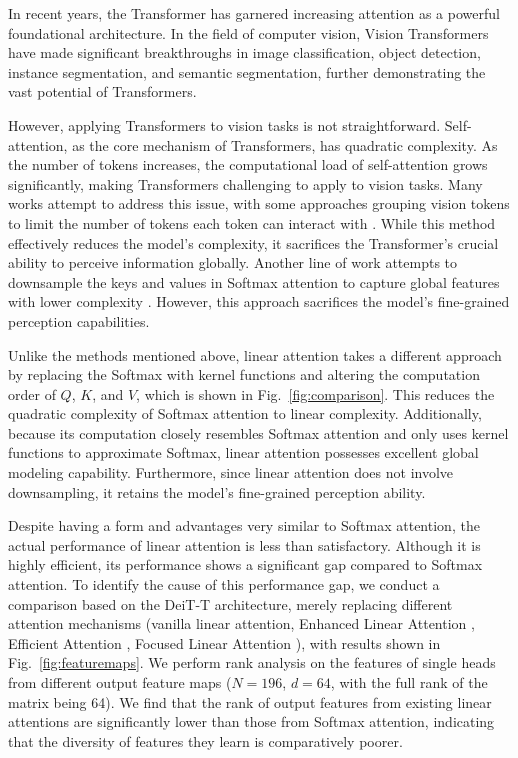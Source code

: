 \documentclass[10pt,twocolumn,letterpaper]{article}
\begin{document}
In recent years, the Transformer \cite{vaswani2017attention} has garnered increasing attention as a powerful foundational architecture. In the field of computer vision, Vision Transformers \cite{dosovitskiy2020image} have made significant breakthroughs in image classification, object detection, instance segmentation, and semantic segmentation, further demonstrating the vast potential of Transformers.

However, applying Transformers to vision tasks is not straightforward. Self-attention, as the core mechanism of Transformers, has quadratic complexity. As the number of tokens increases, the computational load of self-attention grows significantly, making Transformers challenging to apply to vision tasks. Many works attempt to address this issue, with some approaches grouping vision tokens to limit the number of tokens each token can interact with \cite{liu2021swin,dong2022cswin,tu2022maxvit,yang2021focal,wang2022crossformer,tang2022quadtree}. While this method effectively reduces the model's complexity, it sacrifices the Transformer's crucial ability to perceive information globally. Another line of work attempts to downsample the keys and values in Softmax attention to capture global features with lower complexity \cite{chen2022regionvit,wang2021pyramid,wang2022pvtv2,ding2022davit}. However, this approach sacrifices the model's fine-grained perception capabilities.

Unlike the methods mentioned above, linear attention \cite{katharopoulos2020transformers,cai2023efficientvit,han2023flatten,lu2024softmax,shen2021efficient,xiong2021nystromformer} takes a different approach by replacing the Softmax with kernel functions and altering the computation order of $Q$, $K$, and $V$, which is shown in Fig.~\ref{fig:comparison}. This reduces the quadratic complexity of Softmax attention to linear complexity. Additionally, because its computation closely resembles Softmax attention and only uses kernel functions to approximate Softmax, linear attention possesses excellent global modeling capability. Furthermore, since linear attention does not involve downsampling, it retains the model's fine-grained perception ability.

Despite having a form and advantages very similar to Softmax attention, the actual performance of linear attention is less than satisfactory. Although it is highly efficient, its performance shows a significant gap compared to Softmax attention. To identify the cause of this performance gap, we conduct a comparison based on the DeiT-T architecture, merely replacing different attention mechanisms (vanilla linear attention, Enhanced Linear Attention \cite{cai2023efficientvit}, Efficient Attention \cite{shen2021efficient}, Focused Linear Attention \cite{han2023flatten}), with results shown in Fig.~\ref{fig:featuremaps}. We perform rank analysis on the features of single heads from different output feature maps ($N = 196$, $d = 64$, with the full rank of the matrix being 64). We find that the rank of output features from existing linear attentions are significantly lower than those from Softmax attention, indicating that the diversity of features they learn is comparatively poorer.
\end{document}
